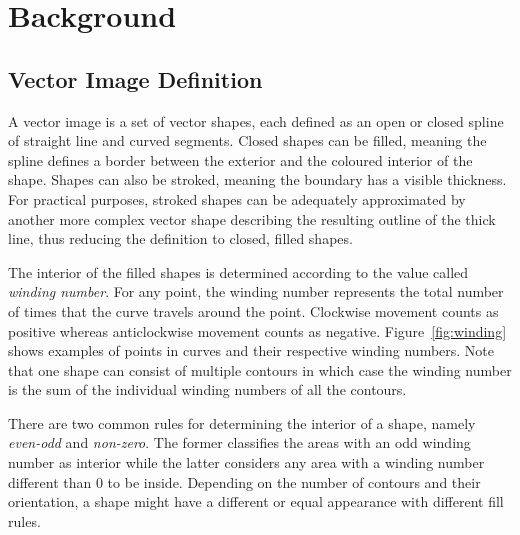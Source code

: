 \documentclass[11pt,a4paper,twoside]{article}
\begin{document}
\section {Background}
\subsection {Vector Image Definition}

A vector image is a set of vector shapes, each defined as an open or closed spline of straight line and curved segments. Closed shapes can be filled, meaning the spline defines a border between the exterior and the coloured interior of the shape. Shapes can also be stroked, meaning the boundary has a visible thickness. For practical purposes, stroked shapes can be adequately approximated by another more complex vector shape describing the resulting outline of the thick line, thus reducing the definition to closed, filled shapes.

The interior of the filled shapes is determined according to the value called \emph{winding number}. For any point, the winding number represents the total number of times that the curve travels around the point. Clockwise movement counts as positive whereas anticlockwise movement counts as negative. Figure~\ref{fig:winding} shows examples of points in curves and their respective winding numbers. Note that one shape can consist of multiple contours in which case the winding number is the sum of the individual winding numbers of all the contours.

There are two common rules for determining the interior of a shape, namely \emph{even-odd} and \emph{non-zero}. The former classifies the areas with an odd winding number as interior while the latter considers any area with a winding number different than $0$ to be inside. Depending on the number of contours and their orientation, a shape might have a different or equal appearance with different fill rules.
\end{document}
